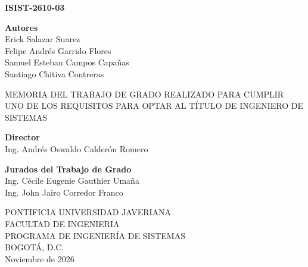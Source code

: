 \thispagestyle{empty}
\begin{center}

    \large
    \textbf{ISIST-2610-03}

    \vspace{0.6cm}

    \large
    \thetitle

    \vspace{0.8cm}

    \textbf{Autores}\\
    \vspace{0.2cm}
    Erick Salazar Suarez \\
    Felipe Andrés Garrido Flores \\
    Samuel Esteban Campos Capañas \\
    Santiago Chitiva Contreras

    \vspace{0.8cm}

    MEMORIA DEL TRABAJO DE GRADO REALIZADO PARA CUMPLIR UNO DE LOS REQUISITOS PARA OPTAR AL TÍTULO DE INGENIERO DE SISTEMAS

    \vspace{0.8cm}

    \textbf{Director}\\
    \vspace{0.2cm}
    Ing. Andrés Oswaldo Calderón Romero

    \vspace{0.8cm}

    \textbf{Jurados del Trabajo de Grado}\\
    \vspace{0.2cm}
    Ing. Cécile Eugenie Gauthier Umaña \\
    Ing. John Jairo Corredor Franco

    \vfill

    PONTIFICIA UNIVERSIDAD JAVERIANA \\
    FACULTAD DE INGENIERIA \\
    PROGRAMA DE INGENIERÍA DE SISTEMAS \\
    BOGOTÁ, D.C. \\
    \vspace{0.3cm}
    Noviembre de 2026

\end{center}
